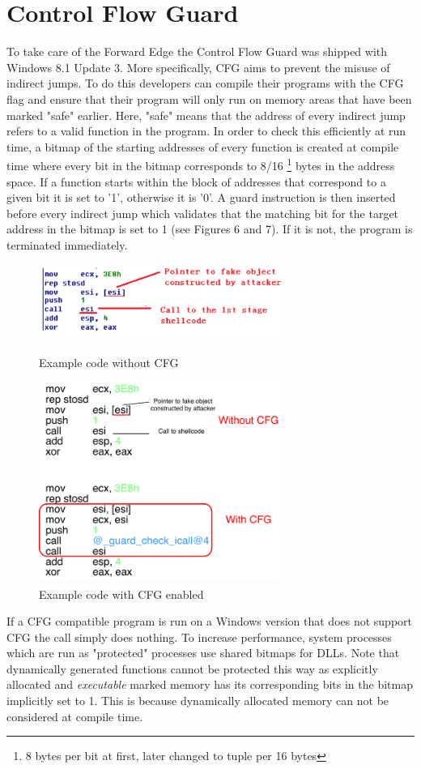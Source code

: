\documentclass[10pt,twocolumn,a4paper]{article}
\begin{document}
\section{Control Flow Guard}\label{CFG}
To take care of the Forward Edge the Control Flow Guard was shipped with Windows 8.1 Update 3.
More specifically, CFG aims to prevent the misuse of indirect jumps.
To do this developers can compile their programs with the CFG flag and ensure that their program will only run on memory areas that have been marked "safe" earlier.
Here, "safe" means that the address of every indirect jump refers to a valid function in the program.
In order to check this efficiently at run time, a bitmap of the starting addresses of every function is created at compile time where every bit in the bitmap corresponds to 8/16 \footnote{8 bytes per bit at first, later changed to tuple per 16 bytes} bytes in the address space.
If a function starts within the block of addresses that correspond to a given bit it is set to '1', otherwise it is '0'.
A guard instruction is then inserted before every indirect jump which validates that the matching bit for the target address in the bitmap is set to 1 (see Figures 6 and 7). If it is not, the program is terminated immediately.
\begin{figure}[htbp]
	\includegraphics[keepaspectratio,width=8cm]{fig/nocfg}
	\caption{Example code without CFG\textsuperscript{\cite{cfgexplore}}}
	\includegraphics[keepaspectratio,width=8cm]{fig/cfg}
	\caption{Example code with CFG enabled\textsuperscript{\cite{cfgexplore}}}
\end{figure}
If a CFG compatible program is run on a Windows version that does not support CFG the call simply does nothing.
To increase performance, system processes which are run as "protected" processes use shared bitmaps for DLLs.
Note that dynamically generated functions cannot be protected this way as explicitly allocated and \emph{executable} marked memory has its corresponding bits in the bitmap implicitly set to 1.
This is because dynamically allocated memory can not be considered at compile time.
\end{document}
